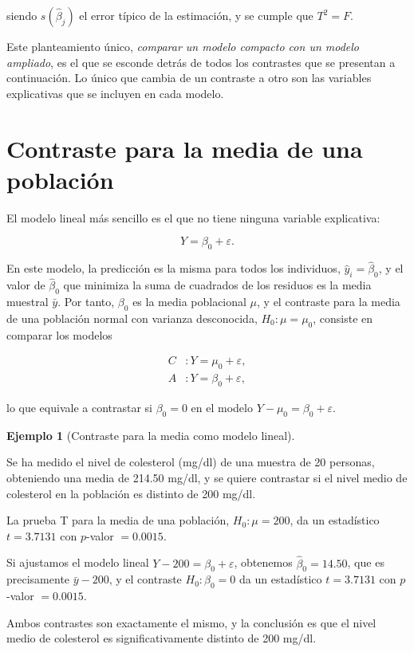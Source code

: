 \documentclass[
  spanish,
  a4paper,
]{scrreport}
\theoremstyle{plain}
\theoremstyle{definition}
\newtheorem{example}{Ejemplo}[chapter]
\theoremstyle{definition}
\theoremstyle{remark}
\begin{document}
siendo \(s(\hat\beta_j)\) el error típico de la estimación, y se cumple
que \(T^2=F\).

Este planteamiento único, \emph{comparar un modelo compacto con un
modelo ampliado}, es el que se esconde detrás de todos los contrastes
que se presentan a continuación. Lo único que cambia de un contraste a
otro son las variables explicativas que se incluyen en cada modelo.

\section{Contraste para la media de una
población}\label{contraste-para-la-media-de-una-poblaciuxf3n}

El modelo lineal más sencillo es el que no tiene ninguna variable
explicativa:

\[
Y = \beta_0 + \varepsilon.
\]

En este modelo, la predicción es la misma para todos los individuos,
\(\hat y_i = \hat\beta_0\), y el valor de \(\hat\beta_0\) que minimiza
la suma de cuadrados de los residuos es la media muestral \(\bar y\).
Por tanto, \(\beta_0\) es la media poblacional \(\mu\), y el contraste
para la media de una población normal con varianza desconocida,
\(H_0: \mu=\mu_0\), consiste en comparar los modelos

\[
\begin{aligned}
C&: Y = \mu_0 + \varepsilon, \\
A&: Y = \beta_0 + \varepsilon,
\end{aligned}
\]

lo que equivale a contrastar si \(\beta_0=0\) en el modelo
\(Y-\mu_0 = \beta_0 + \varepsilon\).

\begin{example}[Contraste para la media como modelo
lineal]\protect\hypertarget{exm-media-modelo-lineal}{}\label{exm-media-modelo-lineal}

Se ha medido el nivel de colesterol (mg/dl) de una muestra de 20
personas, obteniendo una media de 214.50 mg/dl, y se quiere contrastar
si el nivel medio de colesterol en la población es distinto de 200
mg/dl.

La prueba T para la media de una población, \(H_0: \mu=200\), da un
estadístico \(t=3.7131\) con \(p\)-valor \(= 0.0015\).

Si ajustamos el modelo lineal \(Y-200 = \beta_0 + \varepsilon\),
obtenemos \(\hat\beta_0=14.50\), que es precisamente \(\bar y - 200\), y
el contraste \(H_0:\beta_0=0\) da un estadístico \(t=3.7131\) con
\(p\)-valor \(= 0.0015\).

Ambos contrastes son exactamente el mismo, y la conclusión es que el
nivel medio de colesterol es significativamente distinto de 200 mg/dl.

\end{example}
\end{document}
